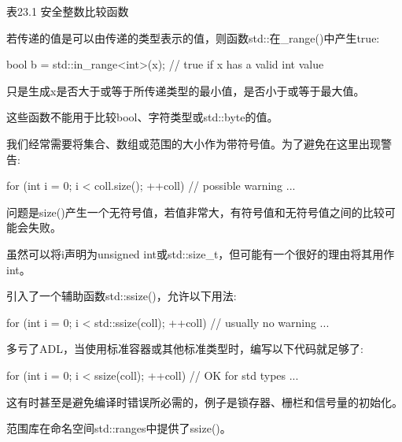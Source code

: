 \begin{center}
表23.1 安全整数比较函数
\end{center}

若传递的值是可以由传递的类型表示的值，则函数std::在\_range()中产生true:

\begin{cpp}
bool b = std::in_range<int>(x); // true if x has a valid int value
\end{cpp}

只是生成x是否大于或等于所传递类型的最小值，是否小于或等于最大值。

这些函数不能用于比较bool、字符类型或std::byte的值。


我们经常需要将集合、数组或范围的大小作为带符号值。为了避免在这里出现警告:

\begin{cpp}
for (int i = 0; i < coll.size(); ++coll) { // possible warning
	...
}
\end{cpp}

问题是size()产生一个无符号值，若值非常大，有符号值和无符号值之间的比较可能会失败。

虽然可以将i声明为unsigned int或std::size\_t，但可能有一个很好的理由将其用作int。

引入了一个辅助函数std::ssize()，允许以下用法:

\begin{cpp}
for (int i = 0; i < std::ssize(coll); ++coll) { // usually no warning
	...
}
\end{cpp}

多亏了ADL，当使用标准容器或其他标准类型时，编写以下代码就足够了:

\begin{cpp}
for (int i = 0; i < ssize(coll); ++coll) { // OK for std types
	...
}
\end{cpp}

这有时甚至是避免编译时错误所必需的，例子是锁存器、栅栏和信号量的初始化。

范围库在命名空间std::ranges中提供了ssize()。















